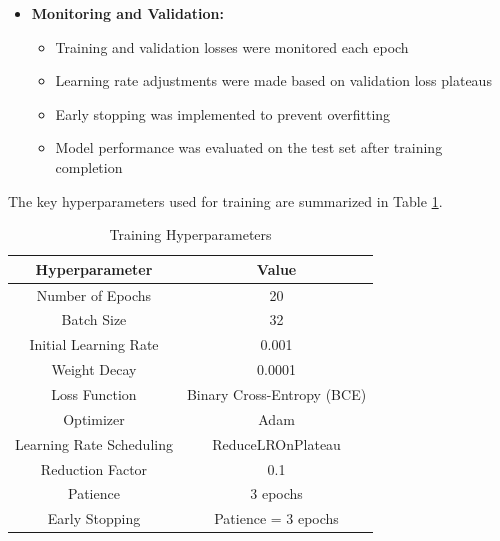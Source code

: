 \begin{itemize}
\begin{itemize}
                  \item \textbf{Monitoring and Validation:}
                  \begin{itemize}
                        \item Training and validation losses were monitored each epoch
                        \item Learning rate adjustments were made based on validation loss plateaus
                        \item Early stopping was implemented to prevent overfitting
                        \item Model performance was evaluated on the test set after training completion
                  \end{itemize}
            \end{itemize} 
            The key hyperparameters used for training are summarized in Table \ref{tab:training_hyperparameters}.
            \begin{table}[h]
                  \centering
                  \caption{Training Hyperparameters}
                  \label{tab:training_hyperparameters}
                  \begin{tabular}{|c|c|}
                  \hline
                  \textbf{Hyperparameter} & \textbf{Value} \\
                  \hline
                  Number of Epochs & 20 \\
                  \hline
                  Batch Size & 32 \\
                  \hline
                  Initial Learning Rate & 0.001 \\
                  \hline
                  Weight Decay & 0.0001 \\
                  \hline
                  Loss Function & Binary Cross-Entropy (BCE) \\
                  \hline
                  Optimizer & Adam \\
                  \hline
                  Learning Rate Scheduling & ReduceLROnPlateau \\
                  \hline
                  Reduction Factor & 0.1 \\
                  \hline
                  Patience & 3 epochs \\
                  \hline
                  Early Stopping & Patience = 3 epochs \\
                  \hline
                  \end{tabular}
            \end{table}
      \end{itemize}
            
